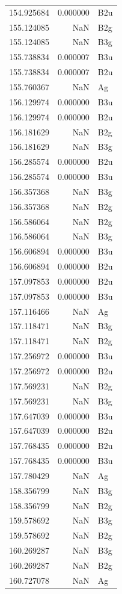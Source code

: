 \begin{longtable}{rrl}
154.925684 & 0.000000 & B2u \\
155.124085 & NaN & B2g \\
155.124085 & NaN & B3g \\
155.738834 & 0.000007 & B3u \\
155.738834 & 0.000007 & B2u \\
155.760367 & NaN & Ag \\
156.129974 & 0.000000 & B3u \\
156.129974 & 0.000000 & B2u \\
156.181629 & NaN & B2g \\
156.181629 & NaN & B3g \\
156.285574 & 0.000000 & B2u \\
156.285574 & 0.000000 & B3u \\
156.357368 & NaN & B3g \\
156.357368 & NaN & B2g \\
156.586064 & NaN & B2g \\
156.586064 & NaN & B3g \\
156.606894 & 0.000000 & B3u \\
156.606894 & 0.000000 & B2u \\
157.097853 & 0.000000 & B2u \\
157.097853 & 0.000000 & B3u \\
157.116466 & NaN & Ag \\
157.118471 & NaN & B3g \\
157.118471 & NaN & B2g \\
157.256972 & 0.000000 & B3u \\
157.256972 & 0.000000 & B2u \\
157.569231 & NaN & B2g \\
157.569231 & NaN & B3g \\
157.647039 & 0.000000 & B3u \\
157.647039 & 0.000000 & B2u \\
157.768435 & 0.000000 & B2u \\
157.768435 & 0.000000 & B3u \\
157.780429 & NaN & Ag \\
158.356799 & NaN & B3g \\
158.356799 & NaN & B2g \\
159.578692 & NaN & B3g \\
159.578692 & NaN & B2g \\
160.269287 & NaN & B3g \\
160.269287 & NaN & B2g \\
160.727078 & NaN & Ag \\

\end{longtable}
